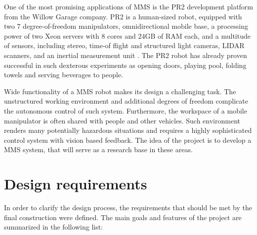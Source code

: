 
One of the most promising applications of MMS is the PR2 development platform from the Willow Garage company. PR2 is a human-sized robot, equipped with two 7 degree-of-freedom manipulators, omnidirectional mobile base, a processing power of two Xeon servers with 8 cores and 24GB of RAM each, and a multitude of sensors, including stereo, time-of flight and structured light cameras, LIDAR scanners, and an inertial measurement unit \cite{prspecs}. The PR2 robot has already proven successful in such dexterous experiments as opening doors, playing pool, folding towels and serving beverages to people. 

Wide functionality of a MMS robot makes its design a challenging task. The unstructured working environment and additional degrees of freedom complicate the autonomous control of such system. Furthermore, the workspace of a mobile manipulator is often shared with people and other vehicles. Such environment renders many potentially hazardous situations and requires a highly sophisticated control system with vision based feedback. The idea of the project is to develop a MMS system, that will serve as a research base in these areas.


\section{Design requirements}
\label{sec:require}

In order to clarify the design process, the requirements that should be met by the final construction were defined. The main goals and features of the project are summarized in the following list:

